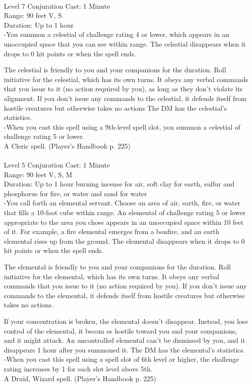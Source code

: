 \documentclass[10pt,twocolumn]{report}
\begin{document}
 \\
Level 7 \quad Conjuration \quad Cast: 1 Minute\\
Range: 90 feet \quad V, S\\
Duration: Up to 1 hour \quad \\
-You summon a celestial of challenge rating 4 or lower, which appears in an unoccupied space that you can see within range. The celestial disappears when it drops to 0 hit points or when the spell ends. 

The celestial is friendly to you and your companions for the duration. Roll initiative for the celestial, which has its own turns. It obeys any verbal commands that you issue to it (no action required by you), as long as they don’t violate its alignment. If you don’t issue any commands to the celestial, it defends itself from hostile creatures but otherwise takes no actions 
The DM has the celestial’s statistics.\\
-When you cast this spell using a 9th-level spell slot, you summon a celestial of challenge rating 5 or lower.\\
A Cleric spell. (Player's Handbook p. 225) \\


 \\
Level 5 \quad Conjuration \quad Cast: 1 Minute\\
Range: 90 feet \quad V, S, M \\
Duration: Up to 1 hour \quad burning incense for air, soft clay for earth, sulfur and phosphorus for fire, or water and sand for water\\
-You call forth an elemental servant. 
Choose an area of air, earth, fire, or water that fills a 10-foot cube within range. An elemental of challenge rating 5 or lower appropriate to the area you chose appears in an unoccupied space within 10 feet of it. For example, a fire elemental emerges from a bonfire, and an earth elemental rises up from the ground. The elemental disappears when it drops to 0 hit points or when the spell ends. 

The elemental is friendly to you and your companions for the duration. Roll initiative for the elemental, which has its own turns. It obeys any verbal commands that you issue to it (no action required by you). If you don’t issue any commands to the elemental, it defends itself from hostile creatures but otherwise takes no actions. 

If your concentration is broken, the elemental doesn’t disappear. Instead, you lose control of the elemental, it becom es hostile toward you and your companions, and it might attack. An uncontrolled elemental can’t be dismissed by you, and it disappears 1 hour after you summoned it. The DM has the elemental’s statistics.\\
-When you cast this spell using a spell slot of 6th level or higher, the challenge rating increases by 1 for each slot level above 5th.\\
A Druid, Wizard spell. (Player's Handbook p. 225) \\
\end{document}
